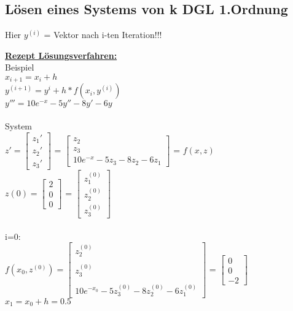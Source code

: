 \documentclass[../ZF_HM2.tex]{subfiles}
\begin{document}
\subsection{Lösen eines Systems von k DGL 1.Ordnung}
Hier $y^{(i)}$ = Vektor nach i-ten Iteration!!!
\begin{mdframed}
\underline{\textbf{Rezept Lösungsverfahren:}}\\
\colorbox{pink!30}{Beispiel}\\
$x_{i+1}= x_i + h$\\
$y^{(i+1)} = y^i + h* f(x_i,y^{(i)})$\\
$y''' = 10e^{-x}-5y''-8y'-6y$\\\\
\colorbox{pink!30}{System}\\
$z'= \left[\begin{matrix}
z_1'\\
z_2'\\
z_3'
\end{matrix} \right]$ = $\left[\begin{matrix}
z_2\\
z_3\\
10e^{-x}-5z_3-8z_2-6z_1
\end{matrix}\right]$ = $f(x,z)$\\
$z(0) = \left[\begin{matrix}
2\\
0\\
0
\end{matrix} \right]$ = $\left[\begin{matrix}
z_1^{(0)}\\
z_2^{(0)}\\
z_3^{(0)}
\end{matrix} \right]$\\\\
\colorbox{violet!30}{i=0:}\\
 $f(x_0,z^{(0)})=\left[\begin{matrix}
z_2^{(0)}\\\\
z_3^{(0)}\\\\
10e^{-x_0}-5z_3^{(0)}-8z_2^{(0)}-6z_1^{(0)}
\end{matrix}\right]$ = $\left[\begin{matrix}
0\\
0\\
-2
\end{matrix} \right]$\\
\colorbox{blue!30}{$x_1= x_0 + h = 0.5$}\\

\end{mdframed}
\end{document}
